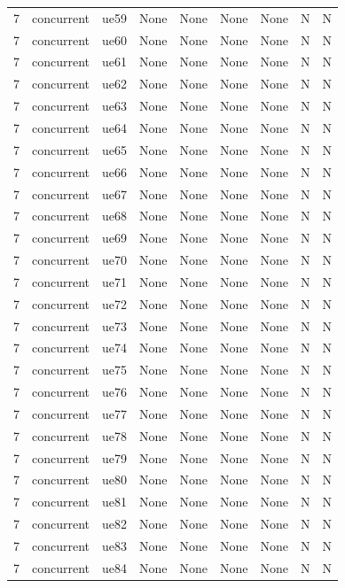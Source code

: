 \begin{table}[ht]
\begin{tabular}{|c|c|c|c|c|c|c|c|c|}
7 & concurrent & ue59 & None & None & None & None & N & N \\
7 & concurrent & ue60 & None & None & None & None & N & N \\
7 & concurrent & ue61 & None & None & None & None & N & N \\
7 & concurrent & ue62 & None & None & None & None & N & N \\
7 & concurrent & ue63 & None & None & None & None & N & N \\
7 & concurrent & ue64 & None & None & None & None & N & N \\
7 & concurrent & ue65 & None & None & None & None & N & N \\
7 & concurrent & ue66 & None & None & None & None & N & N \\
7 & concurrent & ue67 & None & None & None & None & N & N \\
7 & concurrent & ue68 & None & None & None & None & N & N \\
7 & concurrent & ue69 & None & None & None & None & N & N \\
7 & concurrent & ue70 & None & None & None & None & N & N \\
7 & concurrent & ue71 & None & None & None & None & N & N \\
7 & concurrent & ue72 & None & None & None & None & N & N \\
7 & concurrent & ue73 & None & None & None & None & N & N \\
7 & concurrent & ue74 & None & None & None & None & N & N \\
7 & concurrent & ue75 & None & None & None & None & N & N \\
7 & concurrent & ue76 & None & None & None & None & N & N \\
7 & concurrent & ue77 & None & None & None & None & N & N \\
7 & concurrent & ue78 & None & None & None & None & N & N \\
7 & concurrent & ue79 & None & None & None & None & N & N \\
7 & concurrent & ue80 & None & None & None & None & N & N \\
7 & concurrent & ue81 & None & None & None & None & N & N \\
7 & concurrent & ue82 & None & None & None & None & N & N \\
7 & concurrent & ue83 & None & None & None & None & N & N \\
7 & concurrent & ue84 & None & None & None & None & N & N \\

\end{tabular}
\end{table}
